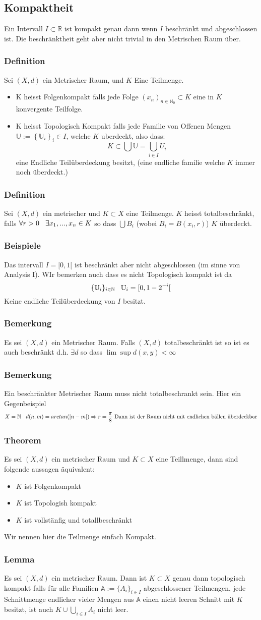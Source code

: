 \documentclass{article}
\newcommand{\smspc}{\hspace{0.3cm}}
\newcommand{\beispiel}[1]{\subsubsection*{Beispiele {#1}}}
\newcommand{\bemerkung}[1]{\subsubsection*{Bemerkung {#1}}}
\newcommand{\theorem}[1]{\subsubsection*{Theorem {#1}}}
\newcommand{\lemma}[1]{\subsubsection*{Lemma {#1}}}
\newcommand{\definition}[1]{\subsubsection*{Definition {#1}}}
\begin{document}
\subsection{Kompaktheit} Ein Intervall $I\subset\mathbb{R}$ ist kompakt genau dann wenn $I$ beschränkt und abgeschlossen ist. Die beschränktheit geht aber nicht trivial in den Metrischen Raum über.
\definition{} Sei $(X,d)$ ein Metrischer Raum, und $K$ Eine Teilmenge.\begin{itemize}
  \item{K heisst Folgenkompakt falls jede Folge $(x_n)_{n\in\mathbb{N}_0}\subset K$ eine in $K$ konvergente Teilfolge.}
\item{K heisst Topologisch Kompakt falls jede Familie von Offenen Mengen $\mathbb{U}:=\left\lbrace\mathbb{U}_i\right\rbrace_i\in I$, welche $K$ uberdeckt, also dass:\[K\subset\bigcup\mathbb{U}=\bigcup_{i\in I}U_i\] eine Endliche Teilüberdeckung besitzt, (eine endliche familie welche $K$ immer noch überdeckt.)}
\end{itemize}
\definition{} Sei $(X,d)$ ein metrischer und $K\subset X$ eine Teilmenge. $K$ heisst totalbeschränkt, falls $\forall r>0\smspc \exists x_1,...,x_n\in K$ so dass $\bigcup B_i$ (wobei $B_i=B(x_i,r)$) $K$ überdeckt.
\beispiel{} Das intervall $I=[0,1[$ ist beschränkt aber nicht abgeschlossen (im sinne von Analysis I). WIr bemerken auch dass es nicht Topologisch kompakt ist da\[\lbrace\mathbb{U}_i\rbrace_{i\in\mathbb{N}}\smspc \mathbb{U}_i=[0,1-2^{-i}[ \] Keine endliche Teilüberdeckung von $I$ besitzt.
\bemerkung{} Es sei $(X,d)$ ein Metrischer Raum. Falls $(X,d)$ totalbeschränkt ist so ist es auch beschränkt d.h. $\exists d$ so dass $\lim \sup d(x,y)<\infty$
\bemerkung{} Ein beschränkter Metrischer Raum muss nicht totalbeschrankt sein. Hier ein Gegenbeispiel\[X=\mathbb{N} \smspc d(n,m)=arctan(|n-m|)\Rightarrow r=\frac{\pi}{8}\text{ Dann ist der Raum nicht mit endlichen bällen überdeckbar}\]
\newpage\theorem{} Es sei $(X,d)$ ein metrischer Raum und $K\subset X$ eine Teillmenge, dann sind folgende aussagen äquivalent:
\begin{itemize}
  \item{$K$ ist Folgenkompakt}
  \item{$K$ ist Topologish  kompakt}
  \item{$K$ ist vollstänfig und totallbeschränkt}
\end{itemize}
Wir nennen hier die Teilmenge einfach Kompakt.
\lemma{} Es sei $(X,d)$ ein metrischer Raum. Dann ist $K\subset X$ genau dann topologisch kompakt falls für alle Familien $\mathbb{A}:=\lbrace A_i\rbrace_{i\in I}$ abgeschlossener Teilmengen, jede Schnittmenge endlicher vieler Mengen aus $\mathbb{A}$ einen nicht leeren Schnitt mit $K$ besitzt, ist auch $K\cup\bigcup_{i\in I} A_i$ nicht leer.
\end{document}
